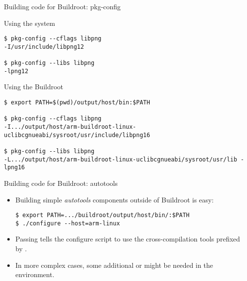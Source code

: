 \begin{frame}[fragile]{Building code for Buildroot: pkg-config}

  \begin{block}{Using the system }
{\scriptsize
\begin{verbatim}
$ pkg-config --cflags libpng
-I/usr/include/libpng12

$ pkg-config --libs libpng
-lpng12
\end{verbatim}}
  \end{block}

  \begin{block}{Using the Buildroot }
{\scriptsize
\begin{verbatim}
$ export PATH=$(pwd)/output/host/bin:$PATH

$ pkg-config --cflags libpng
-I.../output/host/arm-buildroot-linux-uclibcgnueabi/sysroot/usr/include/libpng16

$ pkg-config --libs libpng
-L.../output/host/arm-buildroot-linux-uclibcgnueabi/sysroot/usr/lib -lpng16
\end{verbatim}}
  \end{block}

\end{frame}

\begin{frame}[fragile]{Building code for Buildroot: autotools}
  \begin{itemize}
  \item Building simple {\em autotools} components outside of
    Buildroot is easy:
    \begin{block}{}
{\small
\begin{verbatim}
$ export PATH=.../buildroot/output/host/bin/:$PATH
$ ./configure --host=arm-linux
\end{verbatim}}
\end{block}
\item Passing  tells the configure script to
  use the cross-compilation tools prefixed by .
\item In more complex cases, some additional  or
   might be needed in the environment.
  \end{itemize}
\end{frame}

